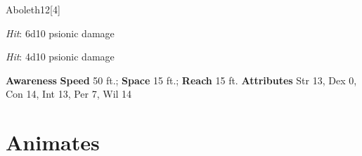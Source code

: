 \begin{monsection}{Aboleth}{12}[4]
\begin{spellcontent}
\begin{spelleffects}
\vspace{0.5em}
\pari

\par


\par \textit{Hit}: 6d10 psionic damage


\vspace{0.5em}
\pari

\par


\par \textit{Hit}: 4d10 psionic damage


\end{spelleffects}

\end{spellcontent}

\begin{monsterfooter}
\pari \textbf{Awareness} 
\pari \textbf{Speed} 50 ft.;
\textbf{Space} 15 ft.;
\textbf{Reach} 15 ft.
\pari \textbf{Attributes}
Str 13,
Dex 0,
Con 14,
Int 13,
Per 7,
Wil 14
\end{monsterfooter}
\end{monsection}


\section{Animates}

